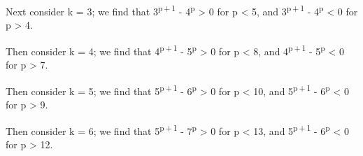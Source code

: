 \documentclass[a4paper,10pt]{article}
\begin{document}
\begin{flushleft}
{{	Next consider k = 3; we find that 3\textsuperscript{p\,+\,1} - 4\textsuperscript{p} > 0 for p < 5, and 3\textsuperscript{p\,+\,1} - 4\textsuperscript{p} < 0 for p > 4.\vspace{2mm}
	
	Then consider k = 4; we find that 4\textsuperscript{p\,+\,1} - 5\textsuperscript{p} > 0 for p < 8, and 4\textsuperscript{p\,+\,1} - 5\textsuperscript{p} < 0 for p > 7.\vspace{2mm}

	Then consider k = 5; we find that 5\textsuperscript{p\,+\,1} - 6\textsuperscript{p} > 0 for p < 10, and 5\textsuperscript{p\,+\,1} - 6\textsuperscript{p} < 0 for p > 9.\vspace{2mm}
	
	Then consider k = 6; we find that 5\textsuperscript{p\,+\,1} - 7\textsuperscript{p} > 0 for p < 13, and 5\textsuperscript{p\,+\,1} - 6\textsuperscript{p} < 0 for p > 12.\linebreak 
	}}
\end{flushleft}
\pagebreak
\end{document}
